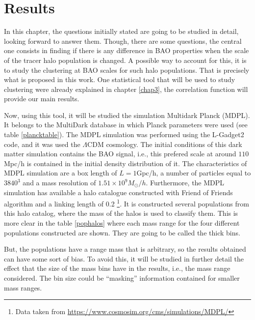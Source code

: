 \chapter{ Results }

In this chapter, the questions initially stated are going to be studied in detail, 
looking forward to answer them. Though, there are some questions, the central one
consists in finding if there is any difference in BAO properties when the scale of the tracer
halo population is changed. A possible way to account for this, it is to study the 
clustering at BAO scales for such halo populations. That is precisely what is proposed
in this work. 
One statistical tool that will be used to study clustering were already explained in chapter \ref{chap3},
the correlation function will provide our main results. 


Now, using this tool, it will be studied the simulation Multidark Planck (MDPL). 
It belongs to the MultiDark database in which Planck parameters were used
(see table \ref{plancktable}). 
The MDPL simulation was performed using the L-Gadget2 code, and it was used the $\Lambda$CDM cosmology. The initial conditions of this dark matter simulation contains the BAO signal, i.e., this prefered scale at around $110$ Mpc/h is contained in the initial density distribution of it. 
The characteristics of MDPL simulation are a box length of $L=1$Gpc/h, a number of particles equal to 
$3840^3$ and a mass resolution of $1.51\times 10^9 M_{\odot}/h$.
Furthermore, the MDPL simulation has available a halo catalogue constructed with Friend of 
Friends algorithm and a linking length of 0.2 \footnote{ Data taken from \url{https://www.cosmosim.org/cms/simulations/MDPL/}}. 
It is constructed several populations from this halo catalog, where the mass of the halos is used to
classify them. This is more clear in the table \ref{pophalos} where each mass range for 
the four different populations constructed are shown. They are going to be called the 
thick bins. 

But, the populations have a range mass that is arbitrary, so
the results obtained can have some sort of bias. To avoid this, 
it will be studied in further detail the effect that 
the size of the mass bins have in the results, i.e., the mass
range considered. The bin size could be ``masking'' information
contained for smaller mass ranges. 	


